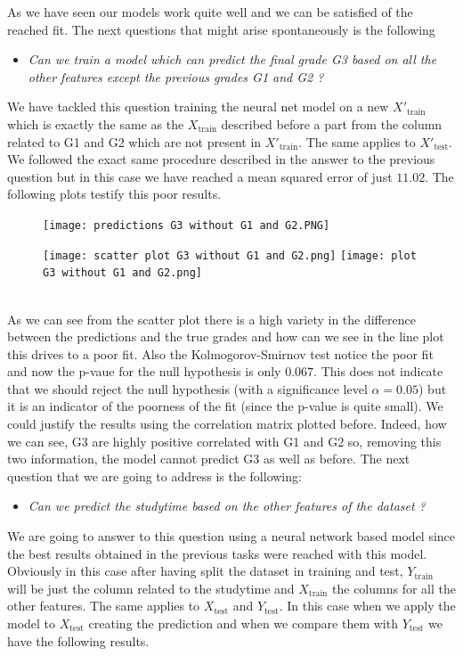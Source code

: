 \documentclass[a4paper, 11pt]{article}
\theoremstyle{definition}
\numberwithin{equation}{section}		%
\numberwithin{table}{section}				%
\begin{document}
As we have seen our models work quite well and we can be satisfied of the reached fit. The next questions that might arise spontaneously is the following
\begin{itemize}
    \item \textit{Can we train a model which can predict the final grade G3 based on all the other features except the previous grades G1 and G2 ?}
\end{itemize}
We have tackled this question training the neural net model on a new $X'_{\text{train}}$ which is exactly the same as the $X_{\text{train}}$ described before a part from the column related to G1 and G2 which are not present in $X'_{\text{train}}$. The same applies to $X'_{\text{test}}$. We followed the exact same procedure described in the answer to the previous question but in this case we have reached a mean squared error of just $11.02$. The following plots testify this poor results.
\\
\begin{figure}[H]\centering
\texttt{[image: predictions G3 without G1 and G2.PNG]}
\end{figure}
\begin{figure}[h]\centering
\texttt{[image: scatter plot G3 without G1 and G2.png]}
\texttt{[image: plot G3 without G1 and G2.png]}
\end{figure}
\\
As we can see from the scatter plot there is a high variety in the difference between the predictions and the true grades and how can we see in the line plot this drives to a poor fit. Also the Kolmogorov-Smirnov test notice the poor fit and now the p-vaue for the null hypothesis is only $0.067$. This does not indicate that we should reject the null hypothesis (with a significance level $\alpha = 0.05$) but it is an indicator of the poorness of the fit (since the p-value is quite small).
We could justify the results using the correlation matrix plotted before. Indeed, how we can see, G3 are highly positive correlated with G1 and G2 so, removing this two information, the model cannot predict G3 as well as before.
The next question that we are going to address is the following:
\begin{itemize}
    \item \textit{Can we predict the studytime based on the other features of the dataset ?}
\end{itemize}
We are going to answer to this question using a neural network based model since the best results obtained in the previous tasks were reached with this model. Obviously in this case after having split the dataset in training and test, $Y_{\text{train}}$ will be just the column related to the studytime and $X_{\text{train}}$ the columns for all the other features. The same applies to $X_{\text{test}}$ and $Y_{\text{test}}$. In this case when we apply the model to $X_{\text{test}}$ creating the prediction and when we compare them with $Y_{\text{test}}$ we have the following results.\\
\end{document}
